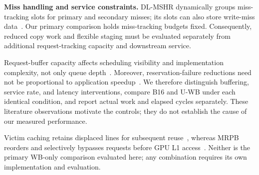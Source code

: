 \textbf{Miss handling and service constraints.}
DL-MSHR dynamically groups miss-tracking slots for primary and secondary
misses; its slots can also store write-miss data~\cite{dlmshr}.
Our primary comparison holds miss-tracking budgets fixed. Consequently,
reduced copy work and flexible staging must be evaluated separately from
additional request-tracking capacity and downstream service.

Request-buffer capacity affects scheduling visibility and implementation
complexity, not only queue depth~\cite{sms}. Moreover, reservation-failure
reductions need not be proportional to application speedup~\cite{dlmshr}.
We therefore distinguish buffering, service rate, and latency interventions,
compare B16 and U-WB under each identical condition, and report actual work
and elapsed cycles separately. These literature observations motivate the
controls; they do not establish the cause of our measured performance.

Victim caching retains displaced lines for subsequent reuse~\cite{victim},
whereas MRPB reorders and selectively bypasses requests before GPU L1
access~\cite{mrpb}. Neither is the primary WB-only comparison evaluated here;
any combination requires its own implementation and evaluation.
